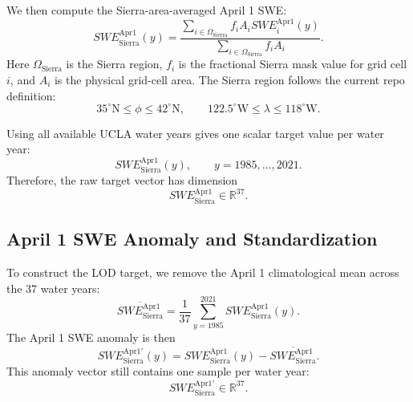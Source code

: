 \documentclass[11pt]{article}
\begin{document}
We then compute the Sierra-area-averaged April 1 SWE:
\begin{equation}
SWE_{\mathrm{Sierra}}^{\mathrm{Apr1}}(y)
=
\frac{
\sum_{i \in \Omega_{\mathrm{Sierra}}}
f_i A_i SWE_i^{\mathrm{Apr1}}(y)
}{
\sum_{i \in \Omega_{\mathrm{Sierra}}}
f_i A_i
}.
\label{eq:swe_apr1_area_average}
\end{equation}
Here $\Omega_{\mathrm{Sierra}}$ is the Sierra region, $f_i$ is the fractional Sierra mask value for
grid cell $i$, and $A_i$ is the physical grid-cell area. The Sierra region follows the current repo
definition:
\begin{equation}
35^\circ\mathrm{N} \leq \phi \leq 42^\circ\mathrm{N},
\qquad
122.5^\circ\mathrm{W} \leq \lambda \leq 118^\circ\mathrm{W}.
\end{equation}

Using all available UCLA water years gives one scalar target value per water year:
\begin{equation}
SWE_{\mathrm{Sierra}}^{\mathrm{Apr1}}(y),
\qquad
y = 1985,\ldots,2021.
\end{equation}
Therefore, the raw target vector has dimension
\begin{equation}
SWE_{\mathrm{Sierra}}^{\mathrm{Apr1}} \in \mathbb{R}^{37}.
\label{eq:swe_target_raw_dim}
\end{equation}

\subsection{April 1 SWE Anomaly and Standardization}
\label{subsec:apr1_swe_anomaly_standardization}

To construct the LOD target, we remove the April 1 climatological mean across the 37 water years:
\begin{equation}
\overline{SWE_{\mathrm{Sierra}}^{\mathrm{Apr1}}}
=
\frac{1}{37}
\sum_{y=1985}^{2021}
SWE_{\mathrm{Sierra}}^{\mathrm{Apr1}}(y).
\label{eq:swe_apr1_climatology}
\end{equation}
The April 1 SWE anomaly is then
\begin{equation}
SWE_{\mathrm{Sierra}}^{\mathrm{Apr1}\prime}(y)
=
SWE_{\mathrm{Sierra}}^{\mathrm{Apr1}}(y)
-
\overline{SWE_{\mathrm{Sierra}}^{\mathrm{Apr1}}}.
\label{eq:swe_apr1_anomaly}
\end{equation}
This anomaly vector still contains one sample per water year:
\begin{equation}
SWE_{\mathrm{Sierra}}^{\mathrm{Apr1}\prime} \in \mathbb{R}^{37}.
\end{equation}
\end{document}
